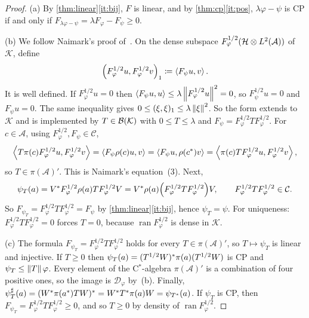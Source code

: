 \documentclass[12pt]{article}
\newcommand{\alg}{\mathcal{A}}             %
\newcommand{\hilb}{\mathcal{H}}            %
\newcommand{\dil}{\mathcal{K}}             %
\newcommand{\bdd}[1]{\mathcal{B}\br{#1}}   %
\newcommand{\ip}[2]{\left\langle #1 , #2 \right\rangle}
\newcommand{\Ltwo}{L^2\br{\alg}}
\newcommand{\Ltn}{\hilb \tensor \Ltwo}
\newcommand{\Fphi}{F_{\varphi}}
\newcommand{\comm}{\mathcal{C}}            %
\newcommand{\ran}{\operatorname{ran}}
\begin{document}
\begin{proof}
(a) By \cref{thm:linear}\ref{it:bij}, \(F\) is linear, and by
\cref{thm:cp}\ref{it:pos}, \(\lambda\varphi - \psi\) is CP if and only if
\(F_{\lambda\varphi - \psi} = \lambda\Fphi - F_\psi \ge 0\).

(b) We follow Naimark's proof of~\cite[\S19, Theorem~1]{Naimark1972}. On the dense
subspace \(\Fphi^{1/2}(\Ltn)\) of \(\dil\), define
\[
  \br{\Fphi^{1/2}u, \Fphi^{1/2}v}_1 \eqdef \ip{F_\psi u}{v}.
\]
It is well defined. If \(\Fphi^{1/2}u = 0\) then
\(\ip{F_\psi u}{u} \le \lambda\norm{\Fphi^{1/2}u}^2 = 0\), so \(F_\psi^{1/2}u = 0\)
and \(F_\psi u = 0\). The same inequality gives
\(0 \le (\xi, \xi)_1 \le \lambda\left\| \xi \right\|^2\). So the form extends to \(\dil\) and is
implemented by \(T \in \bdd\dil\) with \(0 \le T \le \lambda\) and
\(F_\psi = \Fphi^{1/2}T\Fphi^{1/2}\). For \(c \in \alg\), using
\(\Fphi^{1/2}, F_\psi \in \comm\),
\[
  \ip{T\pi(c)\Fphi^{1/2}u}{\Fphi^{1/2}v}
  = \ip{F_\psi\rho(c)u}{v}
  = \ip{F_\psi u}{\rho(c^\adjoint)v}
  = \ip{\pi(c)T\Fphi^{1/2}u}{\Fphi^{1/2}v},
\]
so \(T \in \pi(\alg)'\). This is Naimark's equation~(3). Next,
\[
  \psi_T(a) = V^\adjoint\Fphi^{1/2}\rho(a)T\Fphi^{1/2}V
  = V^\adjoint\rho(a)\br{\Fphi^{1/2}T\Fphi^{1/2}}V,
  \qquad \Fphi^{1/2}T\Fphi^{1/2} \in \comm .
\]
So
\(F_{\psi_T} = \Fphi^{1/2}T\Fphi^{1/2} = F_\psi\) by \cref{thm:linear}\ref{it:bij},
hence \(\psi_T = \psi\). For uniqueness: \(\Fphi^{1/2}T\Fphi^{1/2} = 0\) forces
\(T = 0\), because \(\ran\Fphi^{1/2}\) is dense in \(\dil\).

(c) The formula \(F_{\psi_T} = \Fphi^{1/2}T\Fphi^{1/2}\) holds for every
\(T \in \pi(\alg)'\), so \(T \mapsto \psi_T\) is linear and injective. If
\(T \ge 0\) then \(\psi_T(a) = (T^{1/2}W)^*\pi(a)(T^{1/2}W)\) is CP and
\(\psi_T \le \left\| T \right\|\varphi\). Every element of the C\(^*\)-algebra
\(\pi(\alg)'\) is a combination of four positive ones, so the image is
\(\mathcal{D}_\varphi\) by~(b). Finally,
\(\psi_T^\sharp(a) = (W^*\pi(a^*)TW)^* = W^* T^*\pi(a)W
= \psi_{T^*}(a)\). If \(\psi_T\) is CP, then
\(F_{\psi_T} = \Fphi^{1/2}T\Fphi^{1/2} \ge 0\), and so \(T \ge 0\) by density of
\(\ran\Fphi^{1/2}\).
\end{proof}
\end{document}
